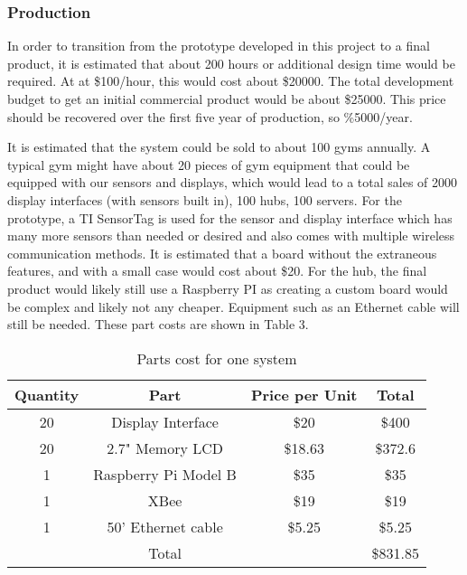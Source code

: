 \documentclass[PPFS.tex]{template/subfiles}
\begin{document}
        \subsubsection{Production}
        
        In order to transition from the prototype developed in this project to a final product, it is estimated that about 200 hours or additional design time would be required. At at \$100/hour, this would cost about \$20000. The total development budget to get an initial commercial product would be about \$25000. This price should be recovered over the first five year of production, so \%5000/year.
        
        It is estimated that the system could be sold to about 100 gyms annually. A typical gym might have about 20 pieces of gym equipment that could be equipped with our sensors and displays, which would lead to a total sales of 2000 display interfaces (with sensors built in), 100 hubs, 100 servers. 
        For the prototype, a TI SensorTag is used for the sensor and display interface which has many more sensors than needed or desired and also comes with multiple wireless communication methods. It is estimated that a board without the extraneous features, and with a small case would cost about \$20.
        For the hub, the final product would likely still use a Raspberry PI as creating a custom board would be complex and likely not any cheaper. Equipment such as an Ethernet cable will still be needed.
        These part costs are shown in Table 3.
        
        \begin{table}[h!]
        	\begin{center}
        		\caption{Parts cost for one system}
        		\begin{tabular}{|c|c|c|c|}
        			\hline
        			Quantity & Part & Price per Unit & Total\\
        			\hline
        			20 & Display Interface & \$20 & \$400\\
        			\hline
        			20 & 2.7" Memory LCD & \$18.63 \cite{mouserMemoryLCD} & \$372.6\\
        			\hline
        			1 & Raspberry Pi Model B & \$35 \cite{alliedRaspberryPi} & \$35\\
        			\hline
        			1 & XBee & \$19 \cite{mouserXBEE} & \$19\\
        			\hline
        			1 & 50' Ethernet cable & \$5.25 \cite{amazonEthernetCable} & \$5.25\\
        			\hline
        			&Total&& \$831.85\\
        			\hline
        		\end{tabular}
        	\end{center}
        \end{table}
        
\end{document}
